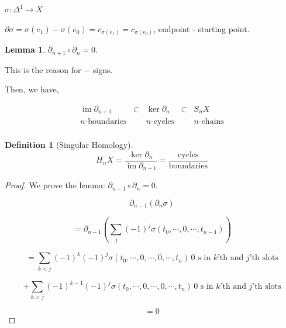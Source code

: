 \documentclass{article}
\theoremstyle{definition}
\newtheorem*{definition}{Definition}
\newtheorem{lemma}[theorem]{Lemma}
\begin{document}
    \(\sigma : \Delta^1 \to X\)

    \(\partial \sigma = \sigma(e_1) - \sigma(e_0) = c_{\sigma(e_1)}=c_{\sigma(e_0)}\), endpoint - starting point.
    
    \begin{lemma}
        \(\partial_{n+1} \circ \partial_n = 0\).

        \begin{center}
        \end{center}

        This is the reason for \(-\) signs.
    \end{lemma}

    Then, we have,

    \[
        \begin{matrix}
            \operatorname{im} \partial_{n+1} & \subset & \ker \partial_n & \subset & S_n X \\
            n \text{-boundaries} &  & n \text{-cycles} &  & n \text{-chains}  \\
        \end{matrix} 
    \]

    \begin{definition}
        [Singular Homology]

        \[
            H_n X = \frac{\ker \partial_n}{\operatorname{im} \partial_{n+1}} = \frac{\text{cycles}}{\text{boundaries}}
        \]
    \end{definition}

    \begin{proof}
        We prove the lemma: \(\partial_{n-1} \circ \partial_n = 0\).

        \[
            \partial_{n-1} (\partial_n \sigma)
        \]

        \[
            = \partial_{n-1} \left( \sum_{j} (-1)^{j} \sigma(t_0, \cdots , 0, \cdots , t_{n-1}) \right) 
        \]

        \[
            = \sum_{k < j} (-1)^k (-1)^j \sigma(t_0, \cdots , 0, \cdots , 0, \cdots , t_n) \, \text{\(0\) s in \(k\)'th and \(j\)'th slots}
        \]

        \[
            + \sum_{k > j} (-1)^{k-1} (-1)^j \sigma(t_0, \cdots , 0, \cdots , 0, \cdots , t_n) \, \text{\(0\) s in \(k\)'th and \(j\)'th slots}
        \]

        \[
            = 0
        \]
    \end{proof}
\end{document}
